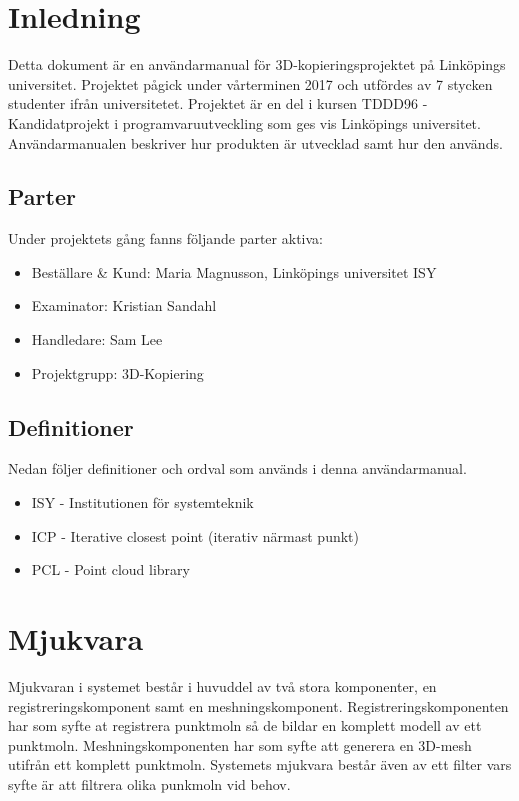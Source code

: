 \documentclass[a4paper,titlepage,12pt]{article}
\begin{document}
\section{Inledning}
	Detta dokument är en användarmanual för 3D-kopieringsprojektet på Linköpings universitet. Projektet pågick under vårterminen 2017 och utfördes av 7 stycken studenter ifrån universitetet. Projektet är en del i kursen TDDD96 - Kandidatprojekt i programvaruutveckling som ges vis Linköpings universitet. Användarmanualen beskriver hur produkten är utvecklad samt hur den används.
	\subsection{Parter}
		Under projektets gång fanns följande parter aktiva:
		
		\begin{itemize}
			\item Beställare \& Kund: Maria Magnusson, Linköpings universitet ISY
			\item Examinator: Kristian Sandahl
			\item Handledare: Sam Lee
			\item Projektgrupp: 3D-Kopiering
		\end{itemize}
		
	\subsection{Definitioner}
		Nedan följer definitioner och ordval som används i denna användarmanual.
		
		\begin{itemize}
			\item ISY - Institutionen för systemteknik
			\item ICP - Iterative closest point (iterativ närmast punkt)
			\item PCL - Point cloud library
		\end{itemize}
    
\newpage  

\section{Mjukvara}
 	Mjukvaran i systemet består i huvuddel av två stora komponenter, en registreringskomponent samt en meshningskomponent. Registreringskomponenten har som syfte at registrera punktmoln så de bildar en komplett modell av ett punktmoln. Meshningskomponenten har som syfte att generera en 3D-mesh utifrån ett komplett punktmoln. Systemets mjukvara består även av ett filter vars syfte är att filtrera olika punkmoln vid behov.
	
\end{document}
